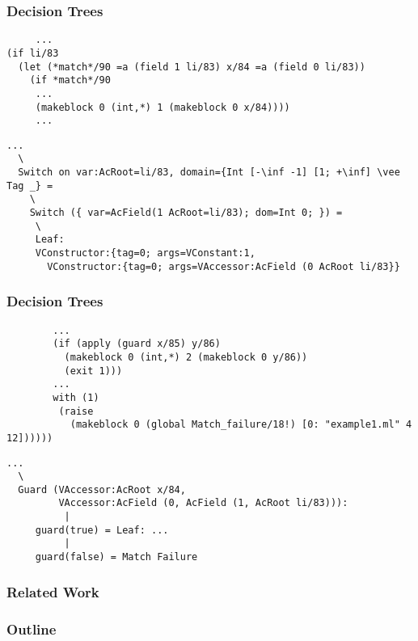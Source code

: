 \documentclass{beamer}
\begin{document}
\begin{frame}[fragile]
  \frametitle{Decision Trees}
  \begin{small}
    \hspace{-1em}
    \begin{minipage}{0.36\linewidth}
      \begin{lstlisting}
     ...
(if li/83
  (let (*match*/90 =a (field 1 li/83) x/84 =a (field 0 li/83))
    (if *match*/90
     ...
     (makeblock 0 (int,*) 1 (makeblock 0 x/84))))
     ...
      \end{lstlisting}
      \hrulefill
      \begin{lstlisting}
...
  \
  Switch on var:AcRoot=li/83, domain={Int [-\inf -1] [1; +\inf] \vee Tag _} =
    \
    Switch ({ var=AcField(1 AcRoot=li/83); dom=Int 0; }) =
     \
     Leaf:
     VConstructor:{tag=0; args=VConstant:1,
       VConstructor:{tag=0; args=VAccessor:AcField (0 AcRoot li/83}}

      \end{lstlisting}
    \end{minipage}
  \end{small}
\end{frame}

\begin{frame}[fragile]
  \frametitle{Decision Trees}
  \begin{small}
    \hspace{-1em}
    \begin{minipage}{0.36\linewidth}
      \begin{lstlisting}
        ...
        (if (apply (guard x/85) y/86)
          (makeblock 0 (int,*) 2 (makeblock 0 y/86))
          (exit 1)))
        ...
        with (1)
         (raise
           (makeblock 0 (global Match_failure/18!) [0: "example1.ml" 4 12])))))
      \end{lstlisting}
      \hrulefill
      \begin{lstlisting}
...
  \
  Guard (VAccessor:AcRoot x/84,
         VAccessor:AcField (0, AcField (1, AcRoot li/83))):
          |
     guard(true) = Leaf: ...
          |
     guard(false) = Match Failure
      \end{lstlisting}
    \end{minipage}
  \end{small}
\end{frame}

\begin{frame}
  \frametitle{Related Work}
\end{frame}

\begin{frame}
  \frametitle{Outline}
  \tableofcontents
\end{frame}
\end{document}
